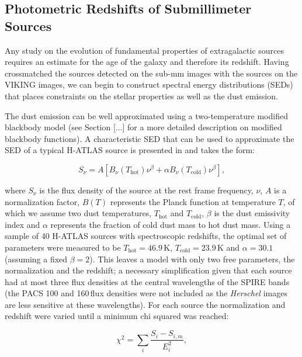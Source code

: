 \subsection{Photometric Redshifts of Submillimeter Sources}
\label{sec:phot_z_Herschel}

Any study on the evolution of fundamental properties of extragalactic sources requires an estimate for the age of the galaxy and therefore its redshift. Having crossmatched the sources detected on the sub-mm images with the sources on the VIKING images, we can begin to construct spectral energy distributions (SEDs) that places constraints on the stellar properties as well as the dust emission. 

The dust emission can be well approximated using a two-temperature modified blackbody model (see Section [...] for a more detailed description on modified blackbody functions). A characteristic SED that can be used to approximate the SED of a typical H-ATLAS source is presented in \citealt{Pearson_2013} and takes the form:

\begin{equation}
    S_\nu = A[B_\nu(T_{\textrm{hot}})\nu^\beta + \alpha B_\nu(T_{\textrm{cold}})\nu^\beta],
\label{eq:pearson_sed_model}
\end{equation}

where $S_\nu$ is the flux density of the source at the rest frame frequency, $\nu$, $A$ is a normalization factor, $B(T)$ represents the Planck function at temperature $T$, of which we assume two dust temperatures, $T_{\textrm{hot}}$ and $T_{\textrm{cold}}$, $\beta$ is the dust emissivity index and $\alpha$ represents the fraction of cold dust mass to hot dust mass. Using a sample of 40 H-ATLAS sources with spectroscopic redshifts, the optimal set of parameters were measured to be $T_{\textrm{hot}} = 46.9$\,K, $T_{\textrm{cold}} = 23.9$\,K and $\alpha = 30.1$ (assuming a fixed $\beta = 2$). This leaves a model with only two free parameters, the normalization and the redshift; a necessary simplification given that each source had at most three flux densities at the central wavelengths of the SPIRE bands (the PACS 100 and 160\,\micron flux densities were not included as the \textit{Herschel} images are less sensitive at these wavelengths). For each source the normalization and redshift were varied until a minimum chi squared was reached:

\begin{equation}
    \chi^2 = \sum_i \frac{S_i - S_{i,m}}{E_i^2},
\end{equation}

